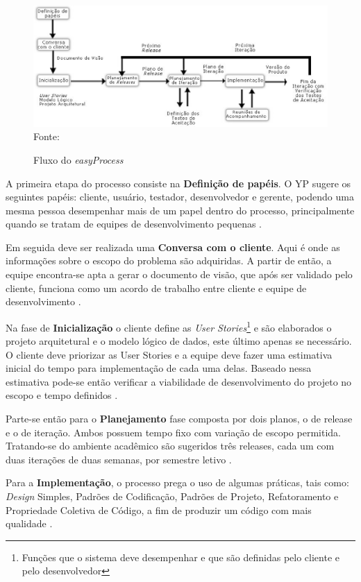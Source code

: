 \documentclass[a4paper,12pt]{monografia}
\begin{document}
\begin{figure}[H]	
\centering
\caption{Fluxo do \textit{easyProcess}}
\includegraphics[width=15cm]{img/yp.eps}
\small{Fonte: \cite{easyprocess}}
\label{figura:yp}
\end{figure}

A primeira etapa do processo consiste na \textbf{Definição de papéis}. O YP sugere os seguintes papéis: cliente, usuário, testador, desenvolvedor e gerente, podendo uma mesma pessoa desempenhar mais de um papel dentro do processo, principalmente quando se tratam de equipes de desenvolvimento pequenas \cite{easyprocess}.

Em seguida deve ser realizada uma \textbf{Conversa com o cliente}. Aqui é onde as informações sobre o escopo do problema
são adquiridas. A partir de então, a equipe encontra-se apta a gerar o documento de visão, que após ser validado pelo cliente, funciona como um acordo de trabalho entre cliente e equipe de desenvolvimento \cite{easyprocess}.

Na fase de \textbf{Inicialização} o cliente define as \textit{User Stories}\footnote{Funções que o sistema deve desempenhar e que são definidas pelo cliente e pelo desenvolvedor} e são elaborados o projeto arquitetural e o modelo lógico de dados, este último apenas se necessário. O cliente deve priorizar as User Stories e a equipe deve fazer uma estimativa inicial do tempo para implementação de cada uma delas. Baseado nessa estimativa pode-se então verificar a viabilidade de desenvolvimento do projeto no escopo e tempo definidos \cite{easyprocess}.

Parte-se então para o \textbf{Planejamento} fase composta por dois planos, o de release e o de iteração. Ambos possuem tempo fixo com variação de escopo permitida. Tratando-se do ambiente acadêmico são sugeridos três releases, cada um com duas iterações de duas semanas, por semestre letivo \cite{easyprocess}. 

Para a \textbf{Implementação}, o processo prega o uso de algumas práticas, tais como: \textit{Design} Simples, Padrões de Codificação, Padrões de Projeto, Refatoramento e Propriedade Coletiva de Código, a fim de produzir um código com mais qualidade \cite{easyprocess}. 
\end{document}
